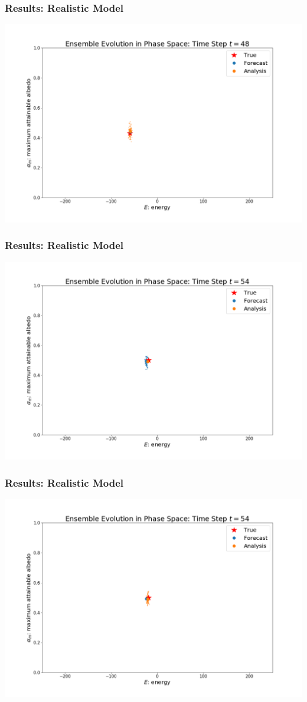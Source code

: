 \documentclass{beamer}
\begin{document}
\begin{frame}
\frametitle{Results: Realistic Model}
\centering
\includegraphics[width=\linewidth]{Figures/EnsembleEvolution_analysis_t=48.png}
\end{frame}
\begin{frame}
\frametitle{Results: Realistic Model}
\centering
\includegraphics[width=\linewidth]{Figures/EnsembleEvolution_forecast_t=54.png}
\end{frame}
\begin{frame}
\frametitle{Results: Realistic Model}
\centering
\includegraphics[width=\linewidth]{Figures/EnsembleEvolution_analysis_t=54.png}
\end{frame}
\end{document}

